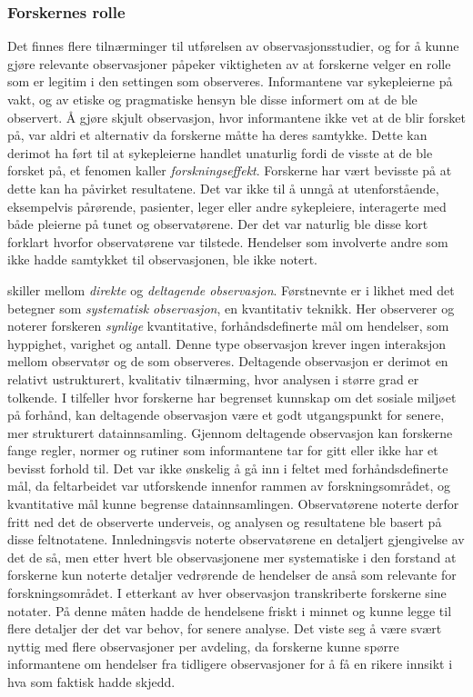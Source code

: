 \subsubsection{Forskernes rolle}
Det finnes flere tilnærminger til utførelsen av observasjonsstudier, og for å kunne gjøre relevante observasjoner påpeker \citet{Tjora} viktigheten av at forskerne velger en rolle som er legitim i den settingen som observeres. Informantene var sykepleierne på vakt, og av etiske og pragmatiske hensyn ble disse informert om at de ble observert. Å gjøre skjult observasjon, hvor informantene ikke vet at de blir forsket på, var aldri et alternativ da forskerne måtte ha deres samtykke. Dette kan derimot ha ført til at sykepleierne handlet unaturlig fordi de visste at de ble forsket på, et fenomen \citet{Tjora} kaller \textit{forskningseffekt}. Forskerne har vært bevisste på at dette kan ha påvirket resultatene. Det var ikke til å unngå at utenforstående, eksempelvis pårørende, pasienter, leger eller andre sykepleiere, interagerte med både pleierne på tunet og observatørene. Der  det var naturlig ble disse kort forklart hvorfor observatørene var tilstede. Hendelser som involverte andre som ikke hadde samtykket til observasjonen, ble ikke notert.
 
\noindent
\citet{Greg} skiller mellom \textit{direkte} og \textit{deltagende observasjon}. Førstnevnte er i likhet med det \citet{Oates} betegner som \textit{systematisk observasjon}, en kvantitativ teknikk. Her observerer og noterer forskeren \textit{synlige} kvantitative, forhåndsdefinerte mål om hendelser, som hyppighet, varighet og antall. Denne type observasjon krever ingen interaksjon mellom observatør og de som observeres.
Deltagende observasjon er derimot en relativt ustrukturert, kvalitativ tilnærming, hvor analysen i større grad er tolkende. I tilfeller hvor forskerne har begrenset kunnskap om det sosiale miljøet på forhånd, kan deltagende observasjon være et godt utgangspunkt for senere, mer strukturert datainnsamling. Gjennom deltagende observasjon kan forskerne fange regler, normer og rutiner som informantene tar for gitt eller ikke har et bevisst forhold til.
Det var ikke ønskelig å gå inn i feltet med forhåndsdefinerte mål, da feltarbeidet var utforskende innenfor rammen av forskningsområdet, og kvantitative mål kunne begrense datainnsamlingen. Observatørene noterte derfor fritt ned det de observerte underveis, og analysen og resultatene ble basert på disse feltnotatene. Innledningsvis noterte observatørene en detaljert gjengivelse av det de så, men etter hvert ble observasjonene mer systematiske i den forstand at forskerne kun noterte detaljer vedrørende de hendelser de anså som relevante for forskningsområdet. I etterkant av hver observasjon transkriberte forskerne sine notater. På denne måten hadde de hendelsene friskt i minnet og kunne legge til flere detaljer der det var behov, for senere analyse. Det viste seg å være svært nyttig med flere observasjoner per avdeling, da forskerne kunne spørre informantene om hendelser fra tidligere observasjoner for å få en rikere innsikt i hva som faktisk hadde skjedd.
 
